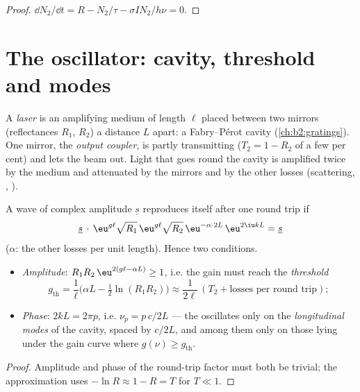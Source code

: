 \begin{proof}
$\dd N_2/\dd t = R - N_2/\tau - \sigma I N_2/h\nu = 0$.
\end{proof}

\section{The oscillator: cavity, threshold and modes}

\begin{definition}\label{def:b2:laser:cavity}
A \emph{laser} is an amplifying medium of length $\ell$
placed between two mirrors (reflectances $R_1$, $R_2$) a distance $L$
apart: a Fabry--Pérot cavity (\cref{ch:b2:gratings}). One mirror, the
\emph{output coupler}, is partly transmitting ($T_2 = 1 - R_2$ of a few
per cent) and lets the beam out. Light that goes round the cavity is
amplified twice by the medium and attenuated by the mirrors and by the
other losses (scattering, , ).
\end{definition}

\begin{theorem}\label{thm:b2:laser:threshold}
A wave of complex amplitude $\underline s$ reproduces itself after one
round trip if
\[
\underline s\,\cdot\, \eu^{g\ell}\sqrt{R_1}\,\eu^{g\ell}\sqrt{R_2}\,
\eu^{-\alpha\cdot 2L}\,\eu^{2\iu kL} = \underline s
\]
($\alpha$: the other losses per unit length). Hence two conditions.
\begin{itemize}
\item \emph{Amplitude}: $R_1R_2\,\eu^{2(g\ell - \alpha L)} \ge 1$, i.e. the
      gain must reach the \emph{threshold}
      \[
      g_{\text{th}} = \frac{1}{\ell}\Big(\alpha L - \tfrac12\ln(R_1R_2)\Big)
      \approx \frac{1}{2\ell}\,(T_2 + \text{losses per round trip}) ;
      \]
\item \emph{Phase}: $2kL = 2\pi p$, i.e. $\nu_p = p\,c/2L$ --- the 
      oscillates only on the \emph{longitudinal modes} of the cavity, spaced by $c/2L$, and among them only on
      those lying under the gain curve where $g(\nu) \ge g_{\text{th}}$.
\end{itemize}
\end{theorem}

\begin{proof}
Amplitude and phase of the round-trip factor must both be trivial; the
approximation uses $-\ln R \approx 1 - R = T$ for $T \ll 1$.
\end{proof}

